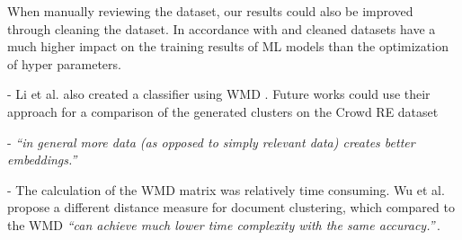 When manually reviewing the dataset, our results could also be improved through cleaning the dataset. In accordance with \cite{chu_data_2016} and \cite{krishnan_data_2016}  cleaned datasets have a much higher impact on the training results of ML models than the optimization of hyper parameters. 

- Li et al. also created a classifier using WMD \cite{li_classifying_2019}. Future works could use their approach for a comparison of the generated clusters on the Crowd RE dataset

- \textit{``in general more data (as opposed to simply relevant data) creates better embeddings.''}\,\cite{kusner_word_2015}

- The calculation of the WMD matrix was relatively time consuming. Wu et al. propose a different distance measure for document clustering, which compared to the WMD \textit{``can achieve much lower time complexity with the same accuracy.''}\,\cite{wu_topic_2017}.
\\[2cm]